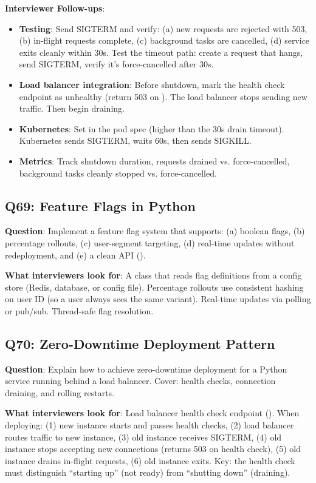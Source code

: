 \textbf{Interviewer Follow-ups}:
\begin{itemize}[leftmargin=*]
    \item \textbf{Testing}: Send SIGTERM and verify: (a) new requests are rejected with 503, (b) in-flight requests complete, (c) background tasks are cancelled, (d) service exits cleanly within 30s. Test the timeout path: create a request that hangs, send SIGTERM, verify it's force-cancelled after 30s.
    \item \textbf{Load balancer integration}: Before shutdown, mark the health check endpoint as unhealthy (return 503 on ). The load balancer stops sending new traffic. Then begin draining.
    \item \textbf{Kubernetes}: Set  in the pod spec (higher than the 30s drain timeout). Kubernetes sends SIGTERM, waits 60s, then sends SIGKILL.
    \item \textbf{Metrics}: Track shutdown duration, requests drained vs. force-cancelled, background tasks cleanly stopped vs. force-cancelled.
\end{itemize}

\subsection{Q69: Feature Flags in Python}

\textbf{Question}: Implement a feature flag system that supports: (a) boolean flags, (b) percentage rollouts, (c) user-segment targeting, (d) real-time updates without redeployment, and (e) a clean API ().

\textbf{What interviewers look for}: A  class that reads flag definitions from a config store (Redis, database, or config file). Percentage rollouts use consistent hashing on user ID (so a user always sees the same variant). Real-time updates via polling or pub/sub. Thread-safe flag resolution.

\subsection{Q70: Zero-Downtime Deployment Pattern}

\textbf{Question}: Explain how to achieve zero-downtime deployment for a Python service running behind a load balancer. Cover: health checks, connection draining, and rolling restarts.

\textbf{What interviewers look for}: Load balancer health check endpoint (). When deploying: (1) new instance starts and passes health checks, (2) load balancer routes traffic to new instance, (3) old instance receives SIGTERM, (4) old instance stops accepting new connections (returns 503 on health check), (5) old instance drains in-flight requests, (6) old instance exits. Key: the health check must distinguish ``starting up'' (not ready) from ``shutting down'' (draining).


